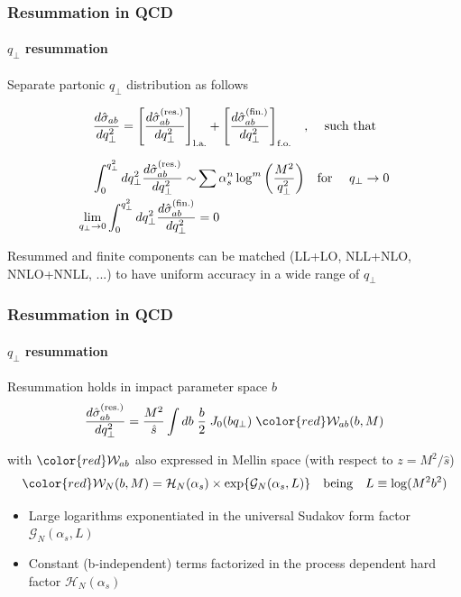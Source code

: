 \documentclass[aspectratio=43]{beamer}
\begin{document}
\begin{frame}

	\frametitle{Resummation in QCD}
	\framesubtitle{$q_{\perp}$ resummation}

	\footnotesize Separate partonic $q_{\perp}$ distribution as follows
	
	\begin{equation}
		\frac{d\hat{\sigma}_{ab}}{dq_{\perp}^{2}} =
		\Bigg[ \frac{d\hat{\sigma}^{\textrm{(res.)}}_{ab}}{dq_{\perp}^{2}} \Bigg]_{\textrm{l.a.}} + 
		\Bigg[ \frac{d\hat{\sigma}^{\textrm{(fin.)}}_{ab}}{dq_{\perp}^{2}} \Bigg]_{\textrm{f.o.}} \textrm{\quad, \quad such that} \nonumber
	\end{equation}

	\begin{align}
		\int_{0}^{q_{\perp}^{2}} dq_{\perp}^{2} \frac{d\hat{\sigma}^{\textrm{(res.)}}_{ab}}{dq_{\perp}^{2}} \sim & \sum \alpha_{s}^{n} \log^{m} \bigg( \frac{M^{2}}{q_{\perp}^{2}} \bigg) \textrm{\quad for \quad} q_{\perp} \rightarrow 0 \nonumber \\
		\lim_{q_{\perp} \rightarrow 0}\int_{0}^{q_{\perp}^{2}} dq_{\perp}^{2} \frac{d\hat{\sigma}^{\textrm{(fin.)}}_{ab}}{dq_{\perp}^{2}} &= 0 \nonumber 
	\end{align}

	\footnotesize Resummed and finite components can be matched (LL+LO, NLL+NLO,\\ NNLO+NNLL, ...) to have uniform accuracy in a wide range of $q_{\perp}$
\end{frame}

\begin{frame}

	\frametitle{Resummation in QCD}
	\framesubtitle{$q_{\perp}$ resummation}
	
	\footnotesize Resummation holds in impact parameter space $b$
	\begin{equation}
		\frac{d\hat{\sigma}_{ab}^{\textrm{(res.)}}}{dq_{\perp}^{2}} = \frac{M^{2}}{\hat{s}} \int db \; \frac{b}{2} \; J_{0}(b q_{\perp}) \; {\color{red} \mathcal{W}_{ab}(b, M)} \nonumber
	\end{equation}
	
	\footnotesize 
	with ${\color{red}\mathcal{W}_{ab}}$ also expressed in Mellin space (with respect to $z = M^{2}/\hat{s}$)
	\begin{equation}
		{\color{red} \mathcal{W}_{N}(b, M) = \mathcal{H}_{N}(\alpha_{s}) \times \exp\{\mathcal{G}_{N}(\alpha_{s}, L)\}} \quad\textrm{being}\quad L \equiv \log(M^{2}b^{2}) \nonumber
	\end{equation}

	\begin{itemize}
		\item Large logarithms exponentiated in the universal Sudakov form factor {\color{red}$\mathcal{G}_{N}(\alpha_{s}, L)$}
		\item Constant (b-independent) terms factorized in the process dependent hard factor {\color{red}$\mathcal{H}_{N}(\alpha_{s})$}
	\end{itemize}
	
\end{frame}
\end{document}
